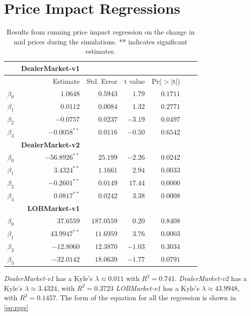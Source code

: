 \documentclass{kththesis}
\theoremstyle{definition}
\begin{document}
\section{Price Impact Regressions}
\begin{table}[H]
\centering
\begin{tabular}{rrrrrrr}
  \hline
  & \textbf{DealerMarket-v1} \\
  \hline
 & Estimate & Std. Error & t value & Pr($>$$|$t$|$) \\ 
 
  \hline
$\beta_0$ & $1.0648$ & $0.5943$ & $1.79$ & $0.1711$  \\ 
  $\beta_1$ & $0.0112$ & $0.0084$ & $1.32$ & $0.2771$  \\ 
  $\beta_2$ & $-0.0757$ & $0.0237$ & $-3.19$ & $0.0497$  \\ 
  $\beta_3$ & $-0.0058^{**}$ & $0.0116$ & $-0.50$ & $0.6542$  \\ 
  
  \hline
  & \textbf{DealerMarket-v2} \\
  \hline
  $\beta_0$ & $-56.8926^{**}$ & $25.199$ & $-2.26$ & $0.0242$ \\ 
  $\beta_1$ & $3.4324^{**}$ & $1.1661$ & $2.94$ & $0.0033$  \\ 
  $\beta_2$ & $-0.2601^{**}$ & $0.0149$ & $17.44$ & $0.0000$ \\ 
  $\beta_3$ & $0.0817^{**}$ & $0.0242$ & $3.38$ & $0.0008$ \\ 
  
  \hline
  & \textbf{LOBMarket-v1} \\
  \hline
  $\beta_0$ & $37.6559$ & $187.0559$ & $0.20$ & $0.8408$ \\ 
  $\beta_1$ & $43.9947^{**}$ & $11.6959$ & $3.76$ & $0.0003$ \\ 
  $\beta_2$ & $-12.8060$ & $12.3870$ & $-1.03$ & $0.3034$ \\ 
  $\beta_3$ & $-32.0142$ & $18.0639$ & $-1.77$ & $0.0791$ \\
   \hline
\end{tabular}
\caption{Results from running price impact regression on the change in mid prices during the simulations. ** indicates significant estimates.}
\label{tab:pi1}
\end{table}
\textit{DealerMarket-v1} has a Kyle's $\lambda \approx 0.011$ with $R^{2}=0.741$. \textit{DealerMarket-v2} has a Kyle's $\lambda \approx 3.4324$, with $R^{2}= 0.3723$ \textit{LOBMarket-v1} has a Kyle's $\lambda \approx 43.9948$, with $R^{2}= 0.1457 $. The form of the equation for all the regression is shown in \autoref{eq:regs}
\end{document}
